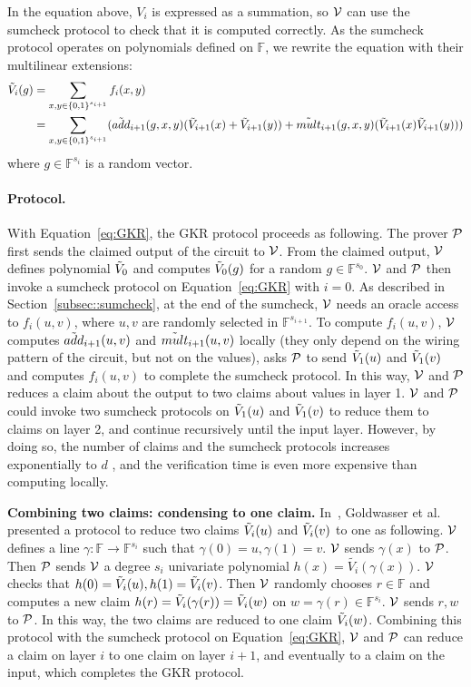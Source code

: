 In the equation above, $V_i$ is expressed as a summation, so $\V$ can use the sumcheck protocol to check that it is computed correctly. As the sumcheck protocol operates on polynomials defined on $\mathbb{F}$, we rewrite the equation with their multilinear extensions:
\begin{align}\label{eq:GKR}
\tV_i(g)&=\sum_{x, y \in\binary^{s_{i+1}}}f_i(x,y)\nonumber\\
&=\sum_{x, y \in\binary^{s_{i+1}}}(\tadd_{i+1}(g,x,y)(\tV_{i+1}(x)+\tV_{i+1}(y))+\tmult_{i+1}(g,x,y)(\tV_{i+1}(x)\tV_{i+1}(y)))
\end{align}
where $g\in\mathbb{F}^{s_i}$ is a random vector. 

\paragraph{Protocol.} With Equation~\ref{eq:GKR}, the GKR protocol proceeds as following. The prover $\P$ first sends the claimed output of the circuit to $\V$. From the claimed output, $\V$ defines polynomial $\tV_0$ and computes $\tV_0(g)$ for a random $g\in\mathbb{F}^{s_0}$. $\V$ and $\P$ then invoke a sumcheck protocol on Equation~\ref{eq:GKR} with $i=0$. As described in Section~\ref{subsec::sumcheck}, at the end of the sumcheck, $\V$ needs an oracle access to $f_i(u,v)$, where $u,v$ are randomly selected in $\mathbb{F}^{s_{i+1}}$. To compute $f_i(u,v)$, $\V$ computes $\tadd_{i+1}(u,v)$ and $\tmult_{i+1}(u,v)$ locally (they only depend on the wiring pattern of the circuit, but not on the values), asks $\P$ to send $\tV_1(u)$ and $\tV_1(v)$ and computes $f_i(u,v)$ to complete the sumcheck protocol. In this way, $\V$ and $\P$ reduces a claim about the output to two claims about values in layer 1. $\V$ and $\P$ could invoke two sumcheck protocols on $\tV_1(u)$ and $\tV_1(v)$ to reduce them to claims on layer 2, and continue recursively until the input layer. However, by doing so, the number of claims and the sumcheck protocols increases exponentially to $d$ , and the verification time is even more expensive than computing locally. 

\smallskip\noindent\textbf{Combining two claims: condensing to one claim.} In~\cite{GKR}, Goldwasser et al. presented a protocol to reduce two claims $\tV_i(u)$ and $\tV_i(v)$ to one as following. $\V$ defines a line $\gamma: \mathbb{F} \rightarrow \mathbb{F}^{s_i}$ such that $\gamma(0)=u, \gamma(1)=v$. $\V$ sends $\gamma(x)$ to $\P$. Then $\P$ sends $\V$ a degree $s_i$ univariate polynomial $h(x)=\tilde{V_i}(\gamma(x))$. $\V$ checks that $h(0)=\tV_i(u), h(1)=\tV_i(v)$. Then $\V$ randomly chooses $r\in\mathbb{F}$ and computes a new claim $h(r) = \tV_i(\gamma(r)) = \tV_i(w)$ on $w=\gamma(r) \in \mathbb{F}^{s_i}$. $\V$ sends $r, w$ to $\P$. In this way, the two claims are reduced to one claim $\tV_i(w)$. Combining this protocol with the sumcheck protocol on Equation~\ref{eq:GKR}, $\V$ and $\P$ can reduce a claim on layer $i$ to one claim on layer $i+1$, and eventually to a claim on the input, which completes the GKR protocol.

